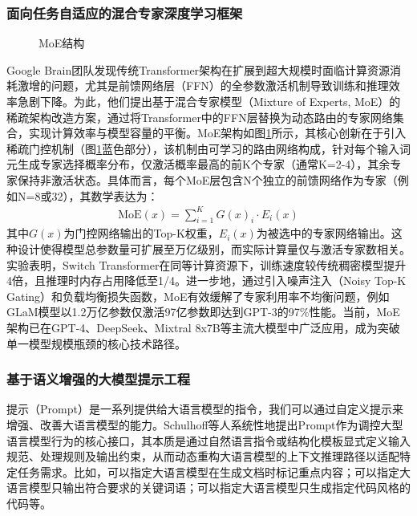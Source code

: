 \documentclass[UTF8,a4paper,12pt]{ctexart}
\numberwithin{equation}{section}
\begin{document}
\subsubsection{面向任务自适应的混合专家深度学习框架}
\begin{figure}[H]
	\caption{MoE结构}
	\label{MoE}
\end{figure}
Google Brain团队发现传统Transformer架构在扩展到超大规模时面临计算资源消耗激增的问题，尤其是前馈网络层（FFN）的全参数激活机制导致训练和推理效率急剧下降。为此，他们提出基于混合专家模型（Mixture of Experts, MoE）\cite{ref15}的稀疏架构改造方案，通过将Transformer中的FFN层替换为动态路由的专家网络集合，实现计算效率与模型容量的平衡。MoE架构如图\ref{MoE}所示，其核心创新在于引入稀疏门控机制（图\ref{MoE}蓝色部分），该机制由可学习的路由网络构成，针对每个输入词元生成专家选择概率分布，仅激活概率最高的前K个专家（通常K=2-4），其余专家保持非激活状态。具体而言，每个MoE层包含N个独立的前馈网络作为专家（例如N=8或32），其数学表达为：
\begin{eqnarray}
	\mathrm{MoE}(x)=\sum_{i=1}^KG(x)_i\cdot E_i(x)
	\label{func_5}
\end{eqnarray}
其中$G(x)$为门控网络输出的Top-K权重，$E_i(x)$为被选中的专家网络输出。这种设计使得模型总参数量可扩展至万亿级别，而实际计算量仅与激活专家数相关。实验表明，Switch Transformer在同等计算资源下，训练速度较传统稠密模型提升4倍，且推理时内存占用降低至1/4。进一步地，通过引入噪声注入（Noisy Top-K Gating）和负载均衡损失函数，MoE有效缓解了专家利用率不均衡问题，例如GLaM模型以1.2万亿参数仅激活97亿参数即达到GPT-3的97\%性能。当前，MoE架构已在GPT-4、DeepSeek、Mixtral 8x7B等主流大模型中广泛应用，成为突破单一模型规模瓶颈的核心技术路径。

\subsubsection{基于语义增强的大模型提示工程}
提示（Prompt）是一系列提供给大语言模型的指令，我们可以通过自定义提示来增强、改善大语言模型的能力。Schulhoff等人\cite{ref16}系统性地提出Prompt作为调控大型语言模型行为的核心接口，其本质是通过自然语言指令或结构化模板显式定义输入规范、处理规则及输出约束，从而动态重构大语言模型的上下文推理路径以适配特定任务需求。比如，可以指定大语言模型在生成文档时标记重点内容；可以指定大语言模型只输出符合要求的关键词语；可以指定大语言模型只生成指定代码风格的代码等。\par
\end{document}
